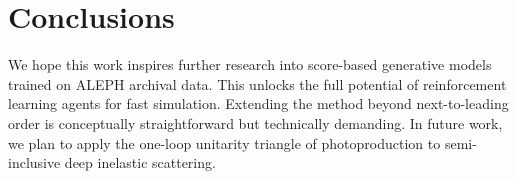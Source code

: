 \section{Conclusions}\label{sec:conclusions}

We hope this work inspires further research into score-based generative
models trained on ALEPH archival data. This unlocks the full potential
of reinforcement learning agents for fast simulation. Extending the
method beyond next-to-leading order is conceptually straightforward but
technically demanding. In future work, we plan to apply the one-loop
unitarity triangle of photoproduction to semi-inclusive deep inelastic
scattering.

